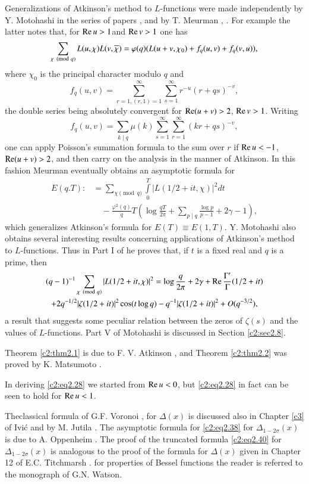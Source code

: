 Generalizations of Atkinson's method to $L$-functions were made
independently by Y. Motohashi in the series of papers \cite{Motohashi3}, and by
T. Meurman \cite{Meurman2}, \cite{Meurman5}. For example the latter notes that, for
$\operatorname{Re} u > 1$\pageoriginale and $\operatorname{Re} v > 1$ one has
$$
\sum_{\chi \pmod{q}} L(u, \chi) L(v, \overline{\chi}) = \varphi (q) (L (u+v,
\chi_0) + f_q (u, v)+ f_q (v, u)),
$$
where $\chi_0$ is the principal character modulo $q$ and 
$$
f_q (u, v)= \sum_{r=1, (r, 1)=1}^\infty \sum_{s=1}^\infty r^{-u} (r+ qs)^{-v},
$$
the double series being absolutely convergent for $\operatorname{Re} (u+v)> 2$, $\operatorname{Re}
v > 1$. Writing
$$
f_q (u, v)= \sum_{k \mid q} \mu(k) \sum_{s=1}^\infty \sum_{r=1}^\infty
(kr + qs)^{-v},
$$
one can apply Poisson's summation formula to the sum over $r$ if $\operatorname{Re}
u < -1$, $\operatorname{Re} (u+v)>2$, and then carry on the analysis in the manner
of Atkinson. In this fashion Meurman eventually obtains an asymptotic
formula for 
\begin{align*}
  E(q. T): &= \sum_{\chi \pmod{q}} \int\limits_0^T |L (1/2 + it,
  \chi)|^2 dt\\ 
  &\quad - \frac{\varphi^2 (q)}{q} T \left(\log \frac{qT}{2 \pi}
  + \sum_{p \mid q} \frac{\log p}{p-1} + 2 \gamma -1 \right),
\end{align*}
which generalizes Atkinson's formula for $E(T) \equiv E(1,
T)$. Y. Motohashi also obtains several interesting results concerning
applications of Atkinson's method to $L$-functions. Thus in Part I of
\cite{Motohashi3} he proves that, if $t$ is a fixed real and $q$ is a prime,
then
\begin{multline*}
  (q-1)^{-1} \sum_{\chi \pmod{q}} |L (1/2 + it, \chi)|^2 = \log
  \frac{q}{2 \pi} + 2 \gamma + \operatorname{Re} \frac{\Gamma'}{\Gamma} (1/2 + it)\\
  + 2 q^{-1/2} |\zeta (1/2 + it)|^2 \cos (t \log q)- q^{-1} |\zeta
  (1/2 + it)|^2 + O (q^{-3/2}),
\end{multline*}
a result that suggests some peculiar relation between the zeros of
$\zeta (s)$ and the values of $L$-functions. Part V of Motohashi
\cite{Motohashi3} is discussed in Section \ref{c2:sec2.8}.

Theorem \ref{c2:thm2.1} is due to F. V. Atkinson \cite{Atkinson2}, and Theorem
\ref{c2:thm2.2}  was proved by K. Matsumoto \cite{Matsumoto1}.

In deriving \eqref{c2:eq2.28} we started from $\operatorname{Re} u < 0$, but
\eqref{c2:eq2.28} in fact can be seen to hold for $\operatorname{Re} u<1$.

The\pageoriginale classical formula of G.F. Voronoi \cite{Voronoi1}, \cite{Voronoi2}
for $\Delta  (x)$ is discussed also in Chapter \ref{c3} of Ivi\'c \cite{Ivic1}
and by M. Jutila \cite{Jutila9}. The asymptotic formula for
\eqref{c2:eq2.38} for $\Delta _{1- 2 \sigma} (x)$ is due to
A. Oppenheim \cite{Oppenheim1}. The proof of the truncated formula
\eqref{c2:eq2.40} for $\Delta _{1- 2 \sigma}(x)$ is analogous to the
proof of the formula for $\Delta (x)$ given in Chapter 12 of
E.C. Titchmarsh \cite{Titchmarsh1}. for properties of Bessel functions the
reader is referred to the monograph of G.N. Watson\cite{Watson1}.

